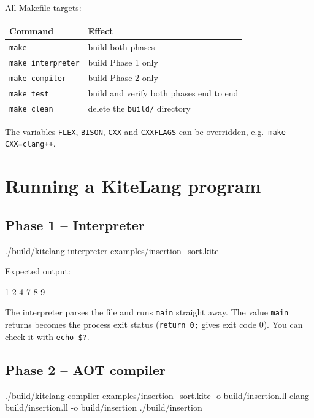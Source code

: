 \documentclass[11pt,a4paper]{article}
\newcommand{\fn}[1]{\texttt{#1}}
\begin{document}
All Makefile targets:

\begin{center}
\begin{tabular}{l l}
\toprule
\textbf{Command} & \textbf{Effect}\\
\midrule
\fn{make} & build both phases\\
\fn{make interpreter} & build Phase 1 only\\
\fn{make compiler} & build Phase 2 only\\
\fn{make test} & build and verify both phases end to end\\
\fn{make clean} & delete the \fn{build/} directory\\
\bottomrule
\end{tabular}
\end{center}

The variables \fn{FLEX}, \fn{BISON}, \fn{CXX} and \fn{CXXFLAGS} can be overridden, e.g.\ \fn{make CXX=clang++}.

\section{Running a KiteLang program}

\subsection{Phase 1 -- Interpreter}

\begin{shell}
./build/kitelang-interpreter examples/insertion_sort.kite
\end{shell}

Expected output:

\begin{outtext}
1
2
4
7
8
9
\end{outtext}

The interpreter parses the file and runs \fn{main} straight away. The value \fn{main} returns becomes the process exit status (\fn{return 0;} gives exit code 0). You can check it with \fn{echo \$?}.

\subsection{Phase 2 -- AOT compiler}
\label{sec:phase2}

\begin{shell}
./build/kitelang-compiler examples/insertion_sort.kite -o build/insertion.ll
clang build/insertion.ll -o build/insertion
./build/insertion
\end{shell}
\end{document}
